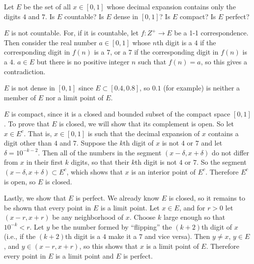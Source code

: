  Let $E$ be the set of all $x\in[0,1]$ whose decimal
expansion contains only the digits $4$ and $7$. Is $E$ countable? Is
$E$ dense in $[0,1]$? Is $E$ compact? Is $E$ perfect?
\begin{solution}
  $E$ is not countable. For, if it is countable, let
  $f\colon Z^+\to E$ be a 1-1 correspondence. Then consider the real
  number $a\in[0,1]$ whose $n$th digit is a $4$ if the corresponding
  digit in $f(n)$ is a $7$, or a $7$ if the corresponding digit in
  $f(n)$ is a $4$. $a\in E$ but there is no positive integer $n$ such
  that $f(n)=a$, so this gives a contradiction.

  $E$ is not dense in $[0,1]$ since $E\subset[0.4,0.8]$, so $0.1$ (for
  example) is neither a member of $E$ nor a limit point of $E$.

  $E$ is compact, since it is a closed and bounded subset of the
  compact space $[0,1]$. To prove that $E$ is closed, we will show
  that its complement is open. So let $x\in E^c$. That is, $x\in[0,1]$
  is such that the decimal expansion of $x$ contains a digit other
  than $4$ and $7$. Suppose the $k$th digit of $x$ is not $4$ or $7$
  and let $\delta = 10^{-k-2}$. Then all of the numbers in the segment
  $(x - \delta, x + \delta)$ do not differ from $x$ in their first $k$
  digits, so that their $k$th digit is not $4$ or $7$. So the segment
  $(x - \delta, x + \delta)\subset E^c$, which shows that $x$ is an
  interior point of $E^c$. Therefore $E^c$ is open, so $E$ is closed.

  Lastly, we show that $E$ is perfect. We already know $E$ is closed,
  so it remains to be shown that every point in $E$ is a limit
  point. Let $x\in E$, and for $r > 0$ let $(x - r, x + r)$ be any
  neighborhood of $x$. Choose $k$ large enough so that $10^{-k} <
  r$. Let $y$ be the number formed by ``flipping'' the $(k+2)$th digit
  of $x$ (i.e., if the $(k+2)$th digit is a $4$ make it a $7$ and vice
  versa). Then $y\neq x$, $y\in E$, and $y\in(x-r,x+r)$, so this shows
  that $x$ is a limit point of $E$. Therefore every point in $E$ is a
  limit point and $E$ is perfect.
\end{solution}
